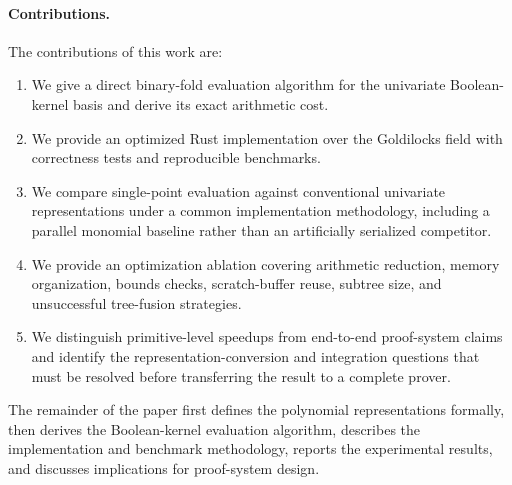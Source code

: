 \paragraph{Contributions.}
The contributions of this work are:
\begin{enumerate}
    \item We give a direct binary-fold evaluation algorithm for the
    univariate Boolean-kernel basis and derive its exact arithmetic cost.

    \item We provide an optimized Rust implementation over the Goldilocks
    field with correctness tests and reproducible benchmarks.

    \item We compare single-point evaluation against conventional
    univariate representations under a common implementation methodology,
    including a parallel monomial baseline rather than an artificially
    serialized competitor.

    \item We provide an optimization ablation covering arithmetic reduction,
    memory organization, bounds checks, scratch-buffer reuse, subtree size,
    and unsuccessful tree-fusion strategies.

    \item We distinguish primitive-level speedups from end-to-end
    proof-system claims and identify the representation-conversion and
    integration questions that must be resolved before transferring the
    result to a complete prover.
\end{enumerate}

The remainder of the paper first defines the polynomial representations
formally, then derives the Boolean-kernel evaluation algorithm, describes
the implementation and benchmark methodology, reports the experimental
results, and discusses implications for proof-system design.

